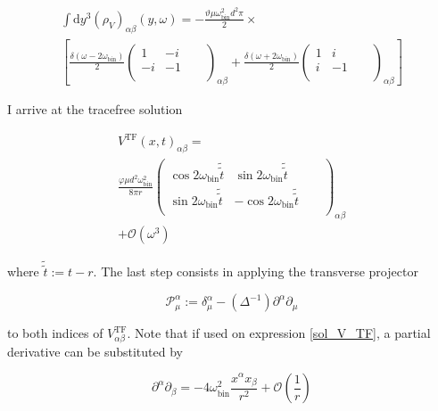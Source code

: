 \documentclass[11pt]{article}
\begin{document}
\begin{multline}
	\int \mathrm{d} y^3 \left( \rho_V \right)_{\alpha \beta}
	\left( 
	y, \omega
	\right)
	=
	- \frac{\vartheta \mu \omega_{\text{bin}}^2 d^2 \pi }{2}
	\times
	\\
	\left[
	\frac{\delta \left( \omega - 2 \omega_{\text{bin}} \right)}{2}
	\begin{pmatrix}
	1 & -i & \\ -i & -1 & \\ & & &
	\end{pmatrix}_{\alpha \beta}
	+
	\frac{\delta \left( \omega + 2 \omega_{\text{bin}} \right)}{2}
	\begin{pmatrix}
	1 & i & \\ i & -1 & \\ & & &
	\end{pmatrix}_{\alpha \beta}
	\right]
\end{multline}

I arrive at the tracefree solution

\begin{multline} \label{sol_V_TF}
	V^{\text{TF}} \left( x, t\right)_{\alpha \beta}
	=
	\\
	\frac{\varphi \mu d^2 \omega_{\text{bin}}^2}{8 \pi r}
	\begin{pmatrix}
		\cos{2 \omega_{\text{bin}} \tilde{ \tilde{ t}}}
		 & \sin{2 \omega_{\text{bin}} \tilde{ \tilde{ t}}}
		 &
		 \\
		 \sin{2 \omega_{\text{bin}} \tilde{ \tilde{ t}}}
		 & - \cos{2 \omega_{\text{bin}} \tilde{ \tilde{ t}}}
		 &
		 \\
		 &
		 &
		 &
	\end{pmatrix}_{\alpha \beta}
	\\
	+ \mathcal{O} \left( \omega^3 \right)
\end{multline}

where $\tilde{ \tilde{ t}} := t - r$. The last step consists in applying the transverse projector

\begin{equation}
	\mathcal{P}_\mu^\alpha 
	:= \delta_\mu^\alpha - \left( \Delta^{-1} \right) 
	\partial^\alpha \partial_\mu
\end{equation}

to both indices of $V^{\text{TF}}_{\alpha \beta}$. Note that if used on expression \ref{sol_V_TF}, a partial derivative can be substituted by

\begin{equation}
	\partial^\alpha \partial_\beta 
	= 
	- 4 \omega_{\text{bin}}^2 
	\frac{x^\alpha x_\beta}{r^2} + \mathcal{O} \left( \frac{1}{r} \right)
\end{equation}
\end{document}

